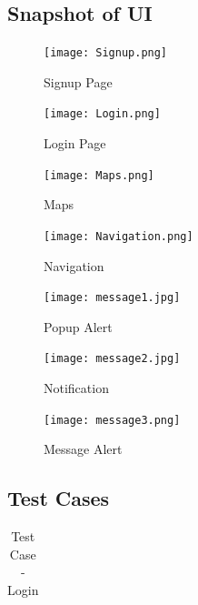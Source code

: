 \documentclass{article}
\begin{document}
\begin{flushleft}
        \subsection{Snapshot of UI}
      \begin{figure}[!h]
	\centering
	\begin{minipage}[t]{4cm}
		\centering
		\texttt{[image: Signup.png]}
		\caption{Signup Page}
	\end{minipage}
	\hspace{3cm}
	\begin{minipage}[t]{4cm}
		\centering
		\texttt{[image: Login.png]}
		\caption{Login Page}
	\end{minipage}
 
	\begin{minipage}[t]{4cm}
		\centering
		\texttt{[image: Maps.png]}
		\caption{Maps }
	\end{minipage}
	\hspace{3cm}
	\begin{minipage}[t]{4cm}
		\centering
		\texttt{[image: Navigation.png]}
		\caption{Navigation}
	\end{minipage}
	
\end{figure}
            \newpage
            \begin{figure}[!h]
	\centering
	\begin{minipage}[t]{4cm}
		\centering
		\texttt{[image: message1.jpg]}
		\caption{Popup Alert}
	\end{minipage}
	\hspace{3cm}
	\begin{minipage}[t]{4cm}
		\centering
		\texttt{[image: message2.jpg]}
		\caption{Notification}
	\end{minipage}
 
	\begin{minipage}[t]{4cm}
		\centering
		\texttt{[image: message3.png]}
		\caption{Message Alert}
	\end{minipage}
	
\end{figure}
\newpage
        
        \subsection{Test Cases}
        \begin{center}
           \begin{table}[!ht]
           \renewcommand\thetable{5.2.1}
               \centering
               \caption{Test Case - Login}
               \label{"""}
              \begin{tabular}{ | m{1cm}| m{2cm}| m{2cm}| m{2cm}| m{2cm} | m{1cm} | }
           

\end{tabular}
\end{table}
\end{center}
\end{flushleft}
\end{document}
